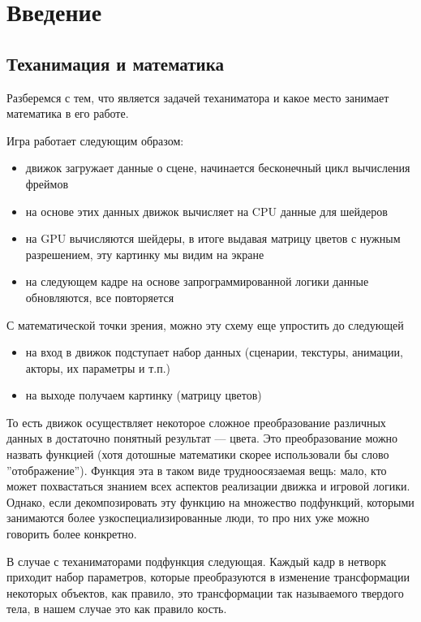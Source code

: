 \documentclass[a4paper,12pt]{article}
\newcounter{z-counter}
\begin{document}
\tableofcontents  %

\section*{Введение}

\subsection*{Теханимация и математика}
Разберемся с тем, что является задачей теханиматора и какое место занимает математика в его работе.

Игра работает следующим образом:
\begin{itemize}
    \item движок загружает данные о сцене, начинается бесконечный цикл вычисления фреймов
    \item на основе этих данных движок вычисляет на CPU данные для шейдеров
    \item на GPU вычисляются шейдеры, в итоге выдавая матрицу цветов с нужным разрешением, эту картинку мы видим на экране
    \item на следующем кадре на основе запрограммированной логики данные обновляются, все повторяется
\end{itemize}

С математической точки зрения, можно эту схему еще упростить до следующей
\begin{itemize}
    \item на вход в движок подступает набор данных (сценарии, текстуры, анимации, акторы, их параметры и т.п.)
    \item на выходе получаем картинку (матрицу цветов)
\end{itemize}
То есть движок осуществляет некоторое сложное преобразование различных данных в достаточно понятный результат --- цвета. Это преобразование можно назвать функцией (хотя дотошные математики скорее использовали бы слово ''отображение''). Функция эта в таком виде трудноосязаемая вещь: мало, кто может похвастаться знанием всех аспектов реализации движка и игровой логики. Однако, если декомпозировать эту функцию на множество подфункций, которыми занимаются более узкоспециализированные люди, то про них уже можно говорить более конкретно.

В случае с теханиматорами подфункция следующая. Каждый кадр в нетворк приходит набор параметров, которые преобразуются в изменение трансформации некоторых объектов, как правило, это трансформации так называемого твердого тела, в нашем случае это как правило кость.
\end{document}
